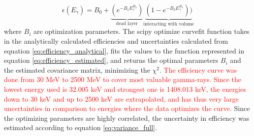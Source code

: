 \begin{equation} \label{eq:efficiency_estimated}
\epsilon(E_\gamma) =  B_0 + \underbrace{(e^{-B_1 E_\gamma^{B_2}})}_\text{dead layer}  \underbrace{(1-e^{-B_3 E_\gamma^{B_4}}))}_\text{interacting with volume} 
\end{equation}
\noindent 
where $B_i$ are optimization parameters. The scipy optimize curvefit function \cite{Virtanen2020} takes in the analytically calculated efficiencies and uncertainties calculated from equation \ref{eq:efficiency_analytical}, fits the values to the function represented in equation \ref{eq:efficiency_estimated}, and returns the optimal parameters $B_i$ and the estimated covariance matrix, minimizing the $\chi^2$. \textcolor{red}{The efficiency curve was done from 30 MeV to 2500 MeV to cover most valuable gamma-rays. Since the lowest energy used is 32.005 keV and strongest one is 1408.013 keV, the energies down to 30 keV and up to 2500 keV are extrapolated, and has thus very large uncertainties in comparison to energies where the data optimizes the curve.} Since the optimizing parameters are highly correlated, the uncertainty in efficiency was estimated according to equation \ref{eq:variance_full}. %
